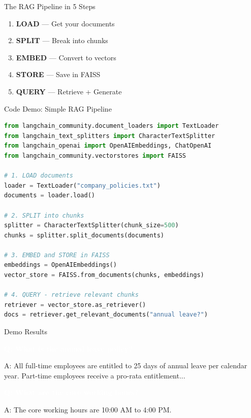\documentclass[aspectratio=169]{beamer}
\begin{document}
\begin{frame}{The RAG Pipeline in 5 Steps}
    \begin{enumerate}
        \item[\textcolor{ragblue}{\textbf{1}}] \textbf{LOAD} --- Get your documents
        \item[\textcolor{ragblue}{\textbf{2}}] \textbf{SPLIT} --- Break into chunks
        \item[\textcolor{ragblue}{\textbf{3}}] \textbf{EMBED} --- Convert to vectors
        \item[\textcolor{ragblue}{\textbf{4}}] \textbf{STORE} --- Save in FAISS
        \item[\textcolor{ragblue}{\textbf{5}}] \textbf{QUERY} --- Retrieve + Generate
    \end{enumerate}
\end{frame}

\begin{frame}[fragile]{Code Demo: Simple RAG Pipeline}
    \begin{lstlisting}[style=pythonstyle, language=Python]
from langchain_community.document_loaders import TextLoader
from langchain_text_splitters import CharacterTextSplitter
from langchain_openai import OpenAIEmbeddings, ChatOpenAI
from langchain_community.vectorstores import FAISS

# 1. LOAD documents
loader = TextLoader("company_policies.txt")
documents = loader.load()

# 2. SPLIT into chunks
splitter = CharacterTextSplitter(chunk_size=500)
chunks = splitter.split_documents(documents)

# 3. EMBED and STORE in FAISS
embeddings = OpenAIEmbeddings()
vector_store = FAISS.from_documents(chunks, embeddings)

# 4. QUERY - retrieve relevant chunks
retriever = vector_store.as_retriever()
docs = retriever.get_relevant_documents("annual leave?")
    \end{lstlisting}
\end{frame}

\begin{frame}{Demo Results}
    \begin{tcolorbox}[colback=codebg, colframe=ragblue, title=\textcolor{white}{Test Output}]
        \textcolor{white}{\textbf{Q: What is the annual leave policy?}}

        \vspace{0.5em}

        \textcolor{codegreen}{A: All full-time employees are entitled to 25 days of annual leave per calendar year. Part-time employees receive a pro-rata entitlement...}

        \vspace{1em}

        \textcolor{white}{\textbf{Q: What are the core working hours?}}

        \vspace{0.5em}

        \textcolor{codegreen}{A: The core working hours are 10:00 AM to 4:00 PM.}
    \end{tcolorbox}
\end{frame}
\end{document}

